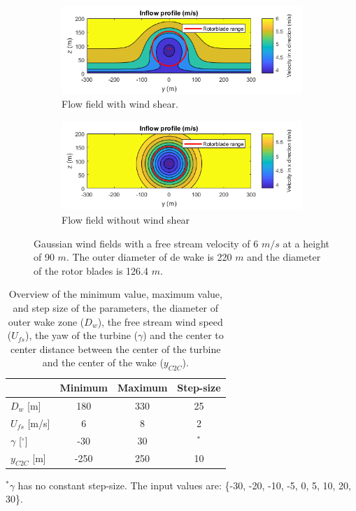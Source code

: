 \begin{figure}
	\centering
	\begin{subfigure}[b]{0.50\textwidth}
		\includegraphics[width=\linewidth]{./Figures/PlotwithshearU6D220.png} %
		\caption{Flow field with wind shear.}
		\label{fig:windsh}
	\end{subfigure}
	
	\begin{subfigure}[b]{0.50\textwidth}
		\includegraphics[width=\linewidth]{./Figures/PlotwithoutshearU6D220.png} %
		\caption{Flow field without wind shear}
		\label{fig:nowindsh}
	\end{subfigure}
	
	\caption[Two Gaussian flow fields]{Gaussian wind fields with a free stream velocity of 6 $m/s$ at a height of 90 $m$. The outer diameter of de wake is 220 $m$ and the diameter of the rotor blades is 126.4 $m$.}
	\label{fig:windshear}
\end{figure}




\begin{table}[h]
	\caption{Overview of the minimum value, maximum value, and step size of the parameters, the diameter of outer wake zone ($D_w$), the free stream wind speed ($U_{fs}$), the yaw of the turbine ($\gamma$) and the center to center distance between the center of the turbine and the center of the wake ($y_{C2C}$).}
	\centering
	\label{tab:pars}
	\begin{tabular}{lccc}
		\hline
	 	& Minimum & Maximum & Step-size \\ 
		\hline
		$D_w$ [m] & 180 & 330 & 25 \\
		$U_{fs}$ [m/s] & 6 & 8 & 2 \\
		$\gamma$ [$^\circ$] & -30 & 30 & $^*$ \\
		$y_{C2C}$ [m] & -250 & 250 & 10 \\
		\hline
	\end{tabular}
$^* \gamma$ has no constant step-size. The input values are: \{-30, -20, -10, -5, 0, 5, 10, 20, 30\}.
\end{table}

